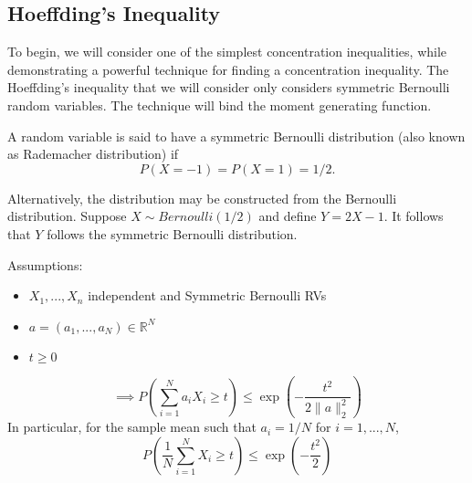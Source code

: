 

\subsection{Hoeffding's Inequality}
To begin, we will consider one of the simplest concentration inequalities, while demonstrating a powerful technique for finding a concentration inequality. The Hoeffding's inequality that we will consider only considers symmetric Bernoulli random variables. The technique will bind the moment generating function. 



\begin{tcolorbox}
\begin{definition}
A random variable is said to have a symmetric Bernoulli distribution (also known as Rademacher distribution) if 
$$P(X=-1) = P(X=1) = 1/2.$$
\end{definition}
\begin{remark}
Alternatively, the distribution may be constructed from the Bernoulli distribution. Suppose $X \sim Bernoulli(1/2)$ and define $Y = 2X-1$. It follows that $Y$ follows the symmetric Bernoulli distribution. 
\end{remark}
\end{tcolorbox}

\begin{tcolorbox}
\begin{theorem}
    Assumptions:
    \begin{itemize}
    \item $X_1, ..., X_n$ independent and Symmetric Bernoulli RVs
    \item $a = (a_1, ..., a_N) \in \mathbb{R}^N$
    \item $t \geq 0$
    \end{itemize}
    \begin{equation}
        \implies P\left(\sum_{i=1}^{N} a_i X_i \geq t\right) \leq \exp{\left(-\frac{t^2}{2\|a\|_{2}^{2}}\right)}
    \end{equation}
    In particular, for the sample mean such that $a_i = 1/N$ for $i=1,...,N$, 
    \begin{equation}
        P\left(\frac{1}{N}\sum_{i=1}^{N} X_i \geq t\right) \leq \exp{\left(-\frac{t^2}{2}\right)}
    \end{equation}
\end{theorem}
\end{tcolorbox}

